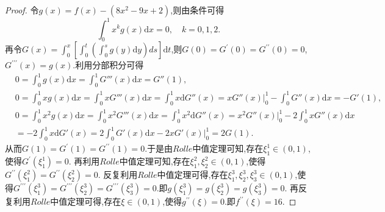 \documentclass[../../main.tex]{subfiles}%
\begin{document}
\begin{proof}

令\(g(x)=f(x)-(8x^2 - 9x + 2)\),则由条件可得
\[
\int_0^1 x^k g(x)\mathrm{d}x = 0, \quad k = 0,1,2.
\]
再令\(G(x)=\int_0^x\left[\int_0^t\left(\int_0^s g(y)\mathrm{d}y\right)ds\right]\mathrm{d}t\),则\(G(0)=G^\prime(0)=G^{\prime\prime}(0)=0\),\(G^{\prime\prime\prime}(x)=g(x)\).利用分部积分可得
\begin{align*}
&0=\int_0^1{g\left( x \right) \mathrm{d}x}=\int_0^1{G'''\left( x \right) \mathrm{d}x}=G''\left( 1 \right) ,
\\
&0=\int_0^1{xg\left( x \right) \mathrm{d}x}=\int_0^1{xG'''\left( x \right) \mathrm{d}x}=\int_0^1{x\mathrm{d}G''\left( x \right)}=xG''\left( x \right) \Big |_{0}^{1}-\int_0^1{G''\left( x \right) \mathrm{d}x}=-G'\left( 1 \right) ,
\\
&0=\int_0^1{x^2g\left( x \right) \mathrm{d}x}=\int_0^1{x^2G'''\left( x \right) \mathrm{d}x}=\int_0^1{x^2\mathrm{d}G''\left( x \right)}=x^2G''\left( x \right) \Big |_{0}^{1}-2\int_0^1{xG''\left( x \right) \mathrm{d}x}
\\
&=-2\int_0^1{x\mathrm{d}G'\left( x \right)}=2\int_0^1{G'\left( x \right) \mathrm{d}x}-2xG'\left( x \right) \Big |_{0}^{1}=2G\left( 1 \right) .
\end{align*}
从而\(G(1)=G^\prime(1)=G^{\prime\prime}(1)=0\).于是由\(Rolle\)中值定理可知,存在\(\xi_1^1\in(0,1)\),使得\(G^\prime(\xi_1^1)=0\).
再利用\(Rolle\)中值定理可知,存在\(\xi_1^2,\xi_2^2\in(0,1)\),使得\(G^{\prime\prime}(\xi_1^2)=G^{\prime\prime}(\xi_2^2)=0\).
反复利用\(Rolle\)中值定理可得,存在\(\xi_1^3,\xi_2^3,\xi_3^3\in(0,1)\),使得\(G^{\prime\prime\prime}(\xi_1^3)=G^{\prime\prime\prime}(\xi_2^3)=G^{\prime\prime\prime}(\xi_3^3)=0\).即\(g(\xi_1^3)=g(\xi_2^3)=g(\xi_3^3)=0\).
再反复利用\(Rolle\)中值定理可得,存在\(\xi\in(0,1)\),使得\(g^{\prime\prime}(\xi)=0\).即\(f^{\prime\prime}(\xi)=16\).

\end{proof}
\end{document}
